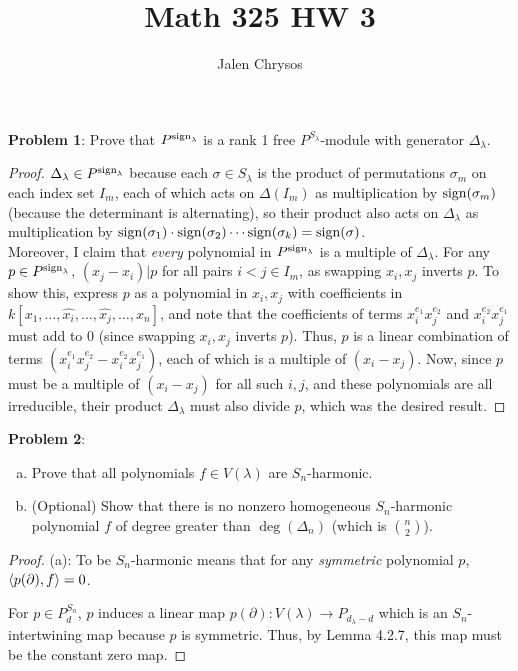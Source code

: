 \documentclass{amsart}
\title{Math 325 HW 3}
\author{Jalen Chrysos}
\begin{document}
	\maketitle	
	
	
	\textbf{Problem 1}: Prove that $P^{\operatorname{sign}_{\lambda}}$ is a rank 1 free $P^{S_{\lambda}}$-module with generator $\Delta_{\lambda}$.
	\begin{proof}
		$\Delta_{\lambda}\in P^{\operatorname{sign}_{\lambda}}$ because each $\sigma \in S_{\lambda}$ is the product of permutations $\sigma_m$ on each index set $I_m$, each of which acts on $\Delta(I_m)$ as multiplication by $\operatorname{sign}(\sigma_m)$ (because the determinant is alternating), so their product also acts on $\Delta_{\lambda}$ as multiplication by $\operatorname{sign}(\sigma_1)\cdot \operatorname{sign}(\sigma_2)\cdots \operatorname{sign}(\sigma_k) = \operatorname{sign}(\sigma)$.\\
		
		Moreover, I claim that \textit{every} polynomial in $P^{\operatorname{sign}_{\lambda}}$ is a multiple of $\Delta_{\lambda}$. For any $p\in P^{\operatorname{sign}_{\lambda}}$, $(x_j-x_i)|p$ for all pairs $i<j \in I_m$, as swapping $x_i,x_j$ inverts $p$. To show this, express $p$ as a polynomial in $x_i,x_j$ with coefficients in $k[x_1,\dots,\hat{x_{i}},\dots, \hat{x_j},\dots,x_n]$, and note that the coefficients of terms $x_i^{e_1}x_j^{e_2}$ and $x_i^{e_2}x_j^{e_1}$ must add to 0 (since swapping $x_i,x_j$ inverts $p$). Thus, $p$ is a linear combination of terms $(x_i^{e_1}x_j^{e_2}-x_i^{e_2}x_j^{e_1})$, each of which is a multiple of $(x_i-x_j)$. Now, since $p$ must be a multiple of $(x_i-x_j)$ for all such $i,j$, and these polynomials are all irreducible, their product $\Delta_{\lambda}$ must also divide $p$, which was the desired result.
	\end{proof}
	
	\newpage 
	
	\textbf{Problem 2}: 
	\begin{enumerate}[(a)]
		\item Prove that all polynomials $f\in V(\lambda)$ are $S_n$-harmonic.
		\item (Optional) Show that there is no nonzero homogeneous $S_n$-harmonic polynomial $f$ of degree greater than $\deg(\Delta_n)$ (which is ${n \choose 2}$).
	\end{enumerate}
	\begin{proof}
		(a): To be $S_n$-harmonic means that for any \textit{symmetric} polynomial $p$, $\langle p(\partial),f\rangle=0$.
		
		
		For $p\in P_d^{S_n}$, $p$ induces a linear map $p(\partial): V(\lambda)\to P_{d_{\lambda}-d}$ which is an $S_n$-intertwining map because $p$ is symmetric. Thus, by Lemma 4.2.7, this map must be the constant zero map.
	\end{proof}
	
\end{document}
